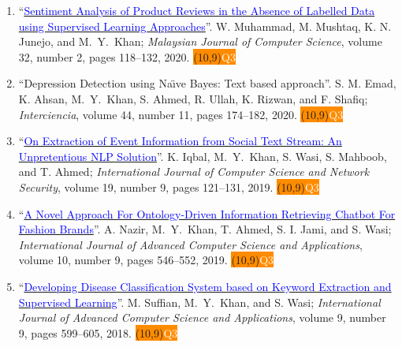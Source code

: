 \documentclass[a4paper, 10pt]{article}
\newcommand{\qthree}{\colorbox{DarkOrange}{\makebox(10,9){\textcolor{white}{Q3}}}}
\begin{document}
\begin{enumerate}
\item ``\href{https://doi.org/10.22452/mjcs.vol33no2.3}{\textcolor{blue}{Sentiment Analysis of Product Reviews in the Absence of Labelled Data using Supervised Learning Approaches}}''. W. Muhammad, M. Mushtaq, K. N. Junejo, and \textcolor{NavyBlue}{M.~Y.~Khan}; \emph{Malaysian Journal of Computer Science}, volume 32, number 2, pages 118--132, 2020. \qthree\  

\item ``Depression Detection using Na\"{\i}ve Bayes: Text based approach''. S. M. Emad, K. Ahsan, \textcolor{NavyBlue}{M.~Y.~Khan}, S. Ahmed, R. Ullah, K. Rizwan, and F. Shafiq; \emph{Interciencia}, volume 44, number 11, pages 174--182, 2020. \qthree\  

\item ``\href{http://paper.ijcsns.org/07_book/201909/20190915.pdf}{\textcolor{blue}{On Extraction of Event Information from Social Text Stream: An Unpretentious NLP Solution}}''. K. Iqbal, \textcolor{NavyBlue}{M.~Y.~Khan}, S. Wasi, S. Mahboob, and T. Ahmed; \emph{International Journal of Computer Science and Network Security}, volume 19, number 9, pages 121--131, 2019. \qthree\ 

\item ``\href{https://doi.org/10.14569/IJACSA.2019.0100972}{\textcolor{blue}{A Novel Approach For Ontology-Driven Information Retrieving Chatbot For Fashion Brands}}''. A. Nazir, \textcolor{NavyBlue}{M.~Y.~Khan}, T. Ahmed, S. I. Jami, and S. Wasi; \emph{International Journal of Advanced Computer Science and Applications}, volume 10, number 9, pages 546--552, 2019. \qthree\ 

\item ``\href{https://doi.org/10.14569/IJACSA.2018.090976}{\textcolor{blue}{Developing Disease Classification System based on Keyword Extraction and Supervised Learning}}''. M. Suffian, \textcolor{NavyBlue}{M.~Y.~Khan}, and S. Wasi; \emph{International Journal of Advanced Computer Science and Applications}, volume 9, number 9, pages 599--605, 2018. \qthree\ 
\end{enumerate}
\end{document}
